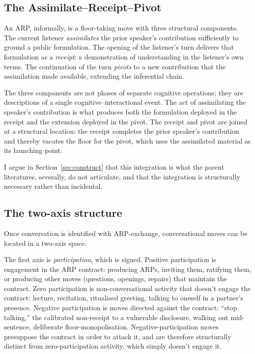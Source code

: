 \subsection{The Assimilate--Receipt--Pivot}

An ARP, informally, is a floor-taking move with three structural components. The current listener \emph{assimilates} the prior speaker's contribution sufficiently to ground a public formulation. The opening of the listener's turn delivers that formulation as a \emph{receipt}: a demonstration of understanding in the listener's own terms. The continuation of the turn \emph{pivots} to a new contribution that the assimilation made available, extending the inferential chain.

The three components are not phases of separate cognitive operations; they are descriptions of a single cognitive--interactional event. The act of assimilating the speaker's contribution is what produces both the formulation deployed in the receipt and the extension deployed in the pivot. The receipt and pivot are joined at a structural location: the receipt completes the prior speaker's contribution and thereby vacates the floor for the pivot, which uses the assimilated material as its launching point.

I argue in Section~\ref{sec:construct} that this integration is what the parent literatures, severally, do not articulate, and that the integration is structurally necessary rather than incidental.

\subsection{The two-axis structure}

Once conversation is identified with ARP-exchange, conversational moves can be located in a two-axis space.

The first axis is \emph{participation}, which is signed. Positive participation is engagement in the ARP contract: producing ARPs, inviting them, ratifying them, or producing other moves (questions, openings, repairs) that maintain the contract. Zero participation is non-conversational activity that doesn't engage the contract: lecture, recitation, ritualised greeting, talking to oneself in a partner's presence. Negative participation is moves directed against the contract: ``stop talking,'' the calibrated non-receipt to a vulnerable disclosure, walking out mid-sentence, deliberate floor-monopolisation. Negative-participation moves presuppose the contract in order to attack it, and are therefore structurally distinct from zero-participation activity, which simply doesn't engage it.

